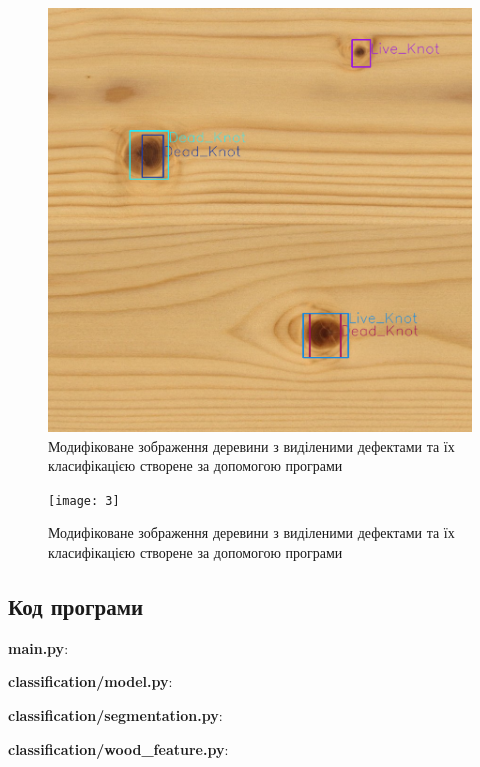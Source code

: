 \documentclass[oneside,14pt]{extarticle}
\begin{document}
\begin{figure}[H]
	\centering
	\includegraphics[scale=0.5]{2}
	\caption{Модифіковане зображення деревини з виділеними дефектами та їх класифікацією створене за допомогою програми}
\end{figure}

\begin{figure}[H]
	\centering
	\texttt{[image: 3]}
	\caption{Модифіковане зображення деревини з виділеними дефектами та їх класифікацією створене за допомогою програми}
\end{figure}

\subsection{Код програми}

\textbf{main.py}:
{\small}

\textbf{classification/model.py}:
{\small}

\textbf{classification/segmentation.py}:
{\small}

\textbf{classification/wood\_feature.py}:
{\small}
\end{document}
